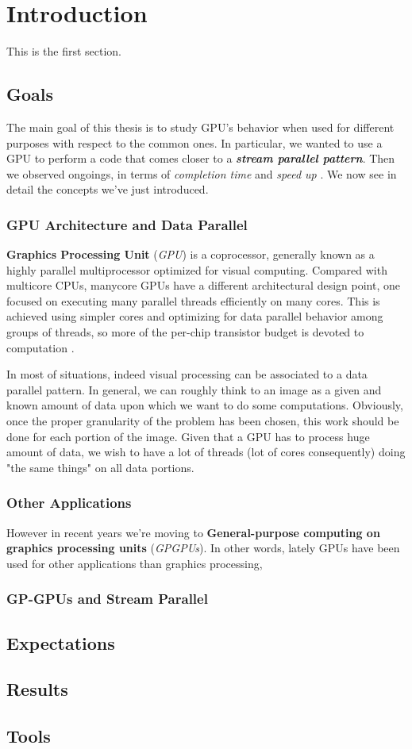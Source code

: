 
\chapter{Introduction} %

	\label{chap:intro}
	This is the first section.
	\section{Goals}
The main goal of this thesis is to study GPU's behavior when used for different purposes with respect to the common ones.
In particular, we wanted to use a GPU to perform a code that comes closer to a \textit{\textbf{stream parallel pattern}}.
Then we observed ongoings, in terms of  \textit{completion time} and \textit{speed up }.
We now see in detail the concepts we've just introduced.

	\subsection{GPU Architecture and Data Parallel}
	\textbf{Graphics Processing Unit} (\textit{GPU}) is a coprocessor, generally known as a highly parallel multiprocessor optimized for visual computing.
	Compared with multicore CPUs, manycore GPUs have a different architectural design point, one focused on executing many parallel threads efficiently on many cores.
	This is achieved using simpler  cores  and  optimizing  for  data parallel  behavior  among  groups  of  threads, so more  of  the  per-chip  transistor  budget  is  devoted to computation \cite{pattersonhennessy}.
	
	In most of situations, indeed visual processing can be associated to a data parallel pattern.
	In general, we can roughly think to an image as a given and known amount of data upon which we want to do some computations. Obviously, once the proper granularity of the problem has been chosen, this work should be done for each 
	portion of the image.
	Given that a GPU has to process huge amount of data, we wish to have a lot of threads (lot of cores consequently) doing "the same things" on all data portions. 
	
	\subsection{Other Applications}
	However in recent years we're moving to \textbf{General-purpose computing on graphics processing units} (\textit{GPGPUs}).
	In other words, lately GPUs have been used for other applications than graphics processing,  
	
	\subsection{GP-GPUs and Stream Parallel}
	
	\section{Expectations}
	
	\section{Results}
	
	\section{Tools}
	
	
